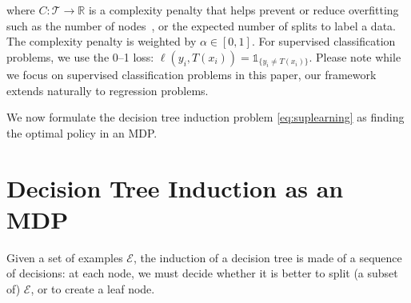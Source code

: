 where $C: \mathcal{T} \rightarrow \mathbb{R}$ is a complexity penalty that helps prevent or reduce overfitting such as the number of nodes~\cite{breiman1984classification,quantbnb}, or the expected number of splits to label a data\cite{how-eff}. The complexity penalty is weighted by $\alpha \in [0, 1]$. %
For supervised classification problems, we use the 0--1 loss: $\ell(y_i, T(x_i)) = \mathds{1}_{\{y_i\neq T(x_i)\}}$. Please note while we focus on supervised classification problems in this paper, our framework extends naturally to regression problems.

We now formulate the decision tree induction problem \ref{eq:suplearning} as finding the optimal policy in an MDP.

\section{Decision Tree Induction as an MDP}\label{sec:MDP}


Given a set of examples $\mathcal{E}$, the induction of a decision tree is made of a sequence of decisions: at each node, we must decide whether it is better to split (a subset of) $\mathcal{E}$, or %
to create a leaf node.

